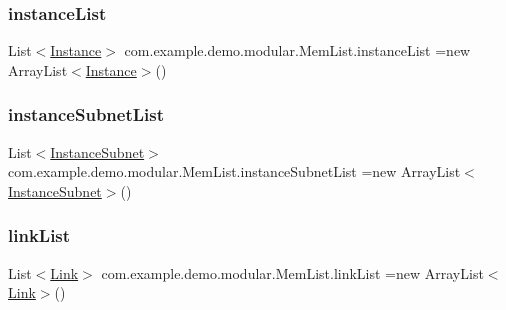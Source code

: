 \subsubsection{\texorpdfstring{instance\+List}{instanceList}}
{\footnotesize\ttfamily List$<$\mbox{\hyperlink{classcom_1_1example_1_1demo_1_1modular_1_1_instance}{Instance}}$>$ com.\+example.\+demo.\+modular.\+Mem\+List.\+instance\+List =new Array\+List$<$\mbox{\hyperlink{classcom_1_1example_1_1demo_1_1modular_1_1_instance}{Instance}}$>$()}

\mbox{\label{classcom_1_1example_1_1demo_1_1modular_1_1_mem_list_a3c347b341271733755f2f01424b29ae9}} 
\subsubsection{\texorpdfstring{instance\+Subnet\+List}{instanceSubnetList}}
{\footnotesize\ttfamily List$<$\mbox{\hyperlink{classcom_1_1example_1_1demo_1_1modular_1_1_instance_subnet}{Instance\+Subnet}}$>$ com.\+example.\+demo.\+modular.\+Mem\+List.\+instance\+Subnet\+List =new Array\+List$<$\mbox{\hyperlink{classcom_1_1example_1_1demo_1_1modular_1_1_instance_subnet}{Instance\+Subnet}}$>$()}

\mbox{\label{classcom_1_1example_1_1demo_1_1modular_1_1_mem_list_aea4f9c8a9fc260d44cb522004b839dfd}} 
\subsubsection{\texorpdfstring{link\+List}{linkList}}
{\footnotesize\ttfamily List$<$\mbox{\hyperlink{classcom_1_1example_1_1demo_1_1modular_1_1_link}{Link}}$>$ com.\+example.\+demo.\+modular.\+Mem\+List.\+link\+List =new Array\+List$<$\mbox{\hyperlink{classcom_1_1example_1_1demo_1_1modular_1_1_link}{Link}}$>$()}

